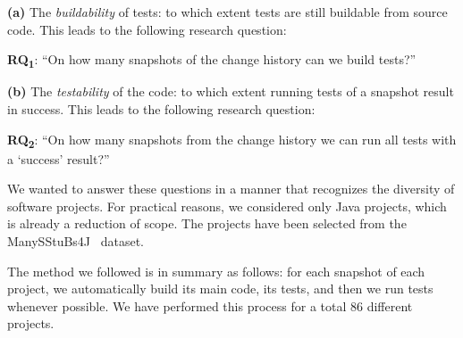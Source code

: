 \textbf{(a)} The \textit{buildability} of tests: to which extent tests are still buildable from source code. 
This leads to the following research question:

\def \RQI{On how many snapshots of the change history can we build tests?}
\def \RQII{On how many snapshots from the change history we can run all tests with a `success' result?}

\textbf{RQ\textsubscript{1}}: ``\RQI''

\textbf{(b)} The \textit{testability} of the code: to which extent running tests of a snapshot result in success. 
This leads to the following research question:

\textbf{RQ\textsubscript{2}}: ``\RQII''


We wanted to answer these questions in a manner that recognizes the diversity of software projects. For practical reasons, we considered only Java projects, which is already a reduction of scope. 
The projects have been selected from the ManySStuBs4J~\cite{karampatsis2020often} dataset.

The method we followed is in summary as follows: for each snapshot of each project, we automatically build its main code, its tests, and then we run tests whenever possible. 
We have performed this process for a total 86 different projects.


